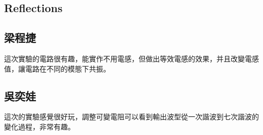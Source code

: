 \documentclass{article}
\begin{document}
\begin{CJK*}{UTF8}{bkai}
\section*{Reflections}
\subsection*{梁程捷}
這次實驗的電路很有趣，能實作不用電感，但做出等效電感的效果，并且改變電感值，讓電路在不同的模態下共振。
\subsection*{吳奕娃}
這次的實驗感覺很好玩，調整可變電阻可以看到輸出波型從一次諧波到七次諧波的變化過程，非常有趣。

\end{CJK*}
\end{document}
